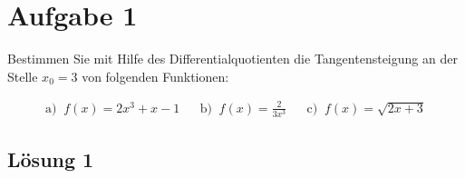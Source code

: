 \documentclass[main.tex]{subfiles}
\begin{document}
\section{Aufgabe 1}
Bestimmen Sie mit Hilfe des Differentialquotienten die Tangentensteigung an der Stelle $x_0 = 3$ von folgenden Funktionen:

\begin{align*}
    \text{a) }\ f(x) = 2x^3+x-1
    & &
    \text{b) }\ f(x) = \frac{2}{3x^3}
    & &
    \text{c) }\ f(x) = \sqrt{2x+3}
\end{align*}

\subsection{Lösung 1}
\end{document}
